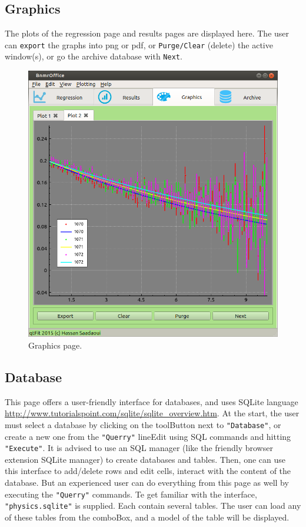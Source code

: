 \documentclass[10pt,letterpaper,oneside]{article}
\begin{document}
\subsection{Graphics}
The plots of the regression page and results pages are displayed here.
The user can \verb+export+ the graphs into png or pdf, or \verb+Purge/Clear+ (delete) 
the active window(s), or go the archive database with \verb+Next+.
\begin{figure}[!htb]
\center
\includegraphics[width=\textwidth]{graphics.png}
 \caption{Graphics page.}
 \label{fig-results}
 \end{figure}



\newpage
\subsection{Database}
This page offers a user-friendly interface for databases, and
uses SQLite language \url{http://www.tutorialspoint.com/sqlite/sqlite_overview.htm}. At the start, the user must select a database by clicking on the toolButton next to \verb+"Database"+, or create a new one from the \verb+"Querry"+ lineEdit using SQL commands and hitting \verb+"Execute"+.
It is advised to use an SQL manager (like the friendly browser extension SQLite manager) to create databases and tables. Then, one can use this interface to add/delete rows and edit cells, interact with the content of the database. But an experienced user can do everything from this page as well by executing the \verb+"Querry"+ commands.
Te get familiar with the interface, \verb+"physics.sqlite"+ is supplied. 
Each contain several tables. The user can load any of these tables from the comboBox, 
and a model of the table will be displayed. 
\end{document}
